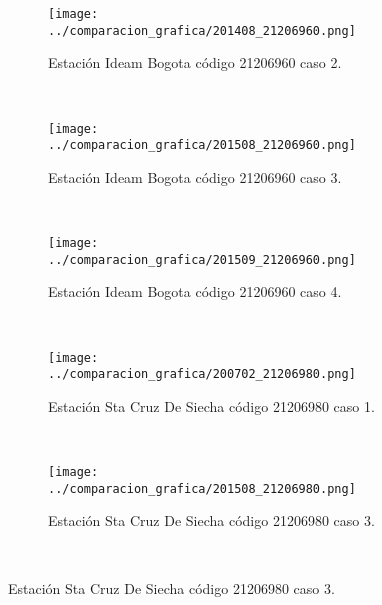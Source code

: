\begin{figure}[H]
\centering
\begin{subfigure}[normla]{0.4\textwidth}
\caption{Estación Ideam Bogota código 21206960 caso 2.}
\texttt{[image: ../comparacion\_grafica/201408\_21206960.png]}
\end{subfigure}
~
\begin{subfigure}[normla]{0.4\textwidth}
\caption{Estación Ideam Bogota código 21206960 caso 3.}
\texttt{[image: ../comparacion\_grafica/201508\_21206960.png]}
\end{subfigure}
~
\begin{subfigure}[normla]{0.4\textwidth}
\caption{Estación Ideam Bogota código 21206960 caso 4.}
\texttt{[image: ../comparacion\_grafica/201509\_21206960.png]}
\end{subfigure}
~
\begin{subfigure}[normla]{0.4\textwidth}
\caption{Estación Sta Cruz De Siecha código 21206980 caso 1.}
\texttt{[image: ../comparacion\_grafica/200702\_21206980.png]}
\end{subfigure}
~
~
\begin{subfigure}[normla]{0.4\textwidth}
\caption{Estación Sta Cruz De Siecha código 21206980 caso 3.}
\texttt{[image: ../comparacion\_grafica/201508\_21206980.png]}
\end{subfigure}
~
\end{figure}
           
